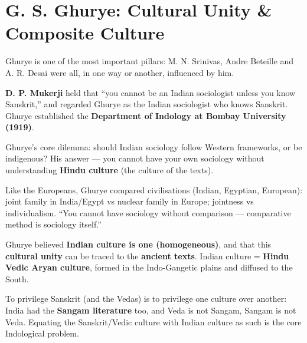 \section{G. S. Ghurye: Cultural Unity \& Composite Culture}

Ghurye is one of the most important pillars: M. N. Srinivas, Andre Beteille and A. R. Desai were all, in one way or another, influenced by him.

\textbf{D. P. Mukerji} held that ``you cannot be an Indian sociologist unless you know Sanskrit,'' and regarded Ghurye as the Indian sociologist who knows Sanskrit. Ghurye established the \textbf{Department of Indology at Bombay University (1919)}.

\begin{KeyConcept}
Ghurye's core dilemma: should Indian sociology follow Western frameworks, or be indigenous? His answer --- you cannot have your own sociology without understanding \textbf{Hindu culture} (the culture of the texts).
\end{KeyConcept}

Like the Europeans, Ghurye compared civilisations (Indian, Egyptian, European): joint family in India/Egypt vs nuclear family in Europe; jointness vs individualism. ``You cannot have sociology without comparison --- comparative method is sociology itself.''

\begin{KeyConcept}
Ghurye believed \textbf{Indian culture is one (homogeneous)}, and that this \textbf{cultural unity} can be traced to the \textbf{ancient texts}. Indian culture = \textbf{Hindu Vedic Aryan culture}, formed in the Indo-Gangetic plains and diffused to the South.
\end{KeyConcept}

\begin{CriticalPoint}
To privilege Sanskrit (and the Vedas) is to privilege one culture over another: India had the \textbf{Sangam literature} too, and Veda is not Sangam, Sangam is not Veda. Equating the Sanskrit/Vedic culture with Indian culture as such is the core Indological problem.
\end{CriticalPoint}

